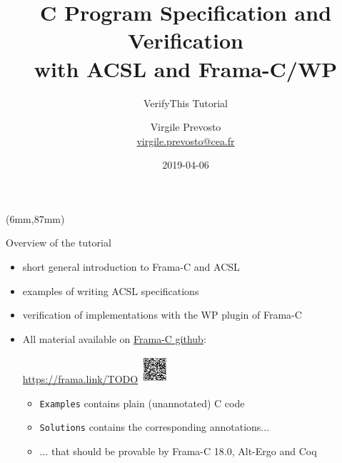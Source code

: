 \documentclass[pdf,xcolor={svgnames}]{beamer}
\author{Virgile Prevosto\\
\href{mailto:virgile.prevosto@cea.fr}{virgile.prevosto@cea.fr}}
\institute{CEA Tech List}
\title{C Program Specification and Verification\\ with ACSL and Frama-C/WP}
\subtitle{VerifyThis Tutorial}
\date{2019-04-06}
\begin{document}
\begin{frame}\maketitle
\begin{textblock*}{1.5cm}(6mm,87mm)
\doclicenseImage[imagewidth=8mm]
\end{textblock*}
\end{frame}

\begin{frame}{Overview of the tutorial}
\begin{itemize}
\item short general introduction to Frama-C and ACSL
\item examples of writing ACSL specifications
\item verification of implementations with the WP plugin of Frama-C
\item All material available on \href{https://github.com/Frama-C/open-source-case-studies/tutorials/2019-04-VerifyThis}{Frama-C github}:
\begin{center}
\url{https://frama.link/TODO}\hspace{5mm}
\includegraphics[width=1cm,align=c]{tuto-qr.pdf}
\end{center}
\begin{itemize}
\item \alert{\texttt{Examples}} contains plain (unannotated) C code
\item \alert{\texttt{Solutions}} contains the corresponding annotations...
\item ... that should be provable by Frama-C 18.0, Alt-Ergo and Coq
\end{itemize}
\end{itemize}
\end{frame}
\end{document}
